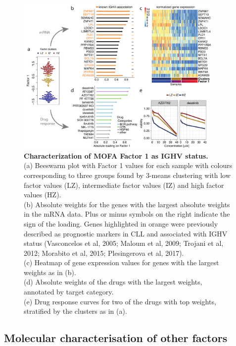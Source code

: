 \begin{figure}[H]
	\centering 	
	\includegraphics[width=0.90\textwidth]{MOFA_CLL_Factor1}
	\caption{
	\textbf{Characterization of MOFA Factor 1 as IGHV status.}\\
	(a) Beeswarm plot with Factor 1 values for each sample with colours corresponding to three groups found by 3-means clustering with low factor values (LZ), intermediate factor values (IZ) and high factor values (HZ).\\
	(b) Absolute weights for the genes with the largest absolute weights in the mRNA data. Plus or minus symbols on the right indicate the sign of the loading. Genes highlighted in orange were previously described as prognostic markers in CLL and associated with IGHV status (Vasconcelos et al, 2005; Maloum et al, 2009; Trojani et al, 2012; Morabito et al, 2015; Plesingerova et al, 2017).\\
	(c) Heatmap of gene expression values for genes with the largest weights as in (b).\\
	(d) Absolute weights of the drugs with the largest weights, annotated by target category.\\
	(e) Drug response curves for two of the drugs with top weights, stratified by the clusters as in (a).
	}
	\label{fig:MOFA_CLL_Factor1}
\end{figure}

\subsection{Molecular characterisation of other factors}

